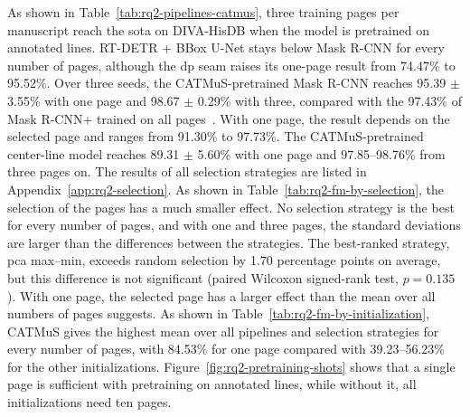 \label{sec:results-rq2-center-line}
As shown in Table~\ref{tab:rq2-pipelines-catmus}, three training pages per manuscript reach the \gls{sota} on DIVA-HisDB when the model is pretrained on annotated lines. RT-DETR + BBox U-Net stays below Mask R-CNN for every number of pages, although the \gls{dp} seam raises its one-page result from 74.47\% to 95.52\%. Over three seeds, the CATMuS-pretrained Mask R-CNN reaches 95.39 \(\pm\) 3.55\% with one page and 98.67 \(\pm\) 0.29\% with three, compared with the 97.43\% of Mask R-CNN+ trained on all pages~\cite{signals3030032}. With one page, the result depends on the selected page and ranges from 91.30\% to 97.73\%. The CATMuS-pretrained center-line model reaches 89.31 \(\pm\) 5.60\% with one page and 97.85--98.76\% from three pages on. The results of all selection strategies are listed in Appendix~\ref{app:rq2-selection}. As shown in Table~\ref{tab:rq2-fm-by-selection}, the selection of the pages has a much smaller effect. No selection strategy is the best for every number of pages, and with one and three pages, the standard deviations are larger than the differences between the strategies. The best-ranked strategy, \gls{pca} max--min, exceeds random selection by 1.70 percentage points on average, but this difference is not significant (paired Wilcoxon signed-rank test, \(p=0.135\)). With one page, the selected page has a larger effect than the mean over all numbers of pages suggests. As shown in Table~\ref{tab:rq2-fm-by-initialization}, CATMuS gives the highest mean over all pipelines and selection strategies for every number of pages, with 84.53\% for one page compared with 39.23--56.23\% for the other initializations. Figure~\ref{fig:rq2-pretraining-shots} shows that a single page is sufficient with pretraining on annotated lines, while without it, all initializations need ten pages.

%

